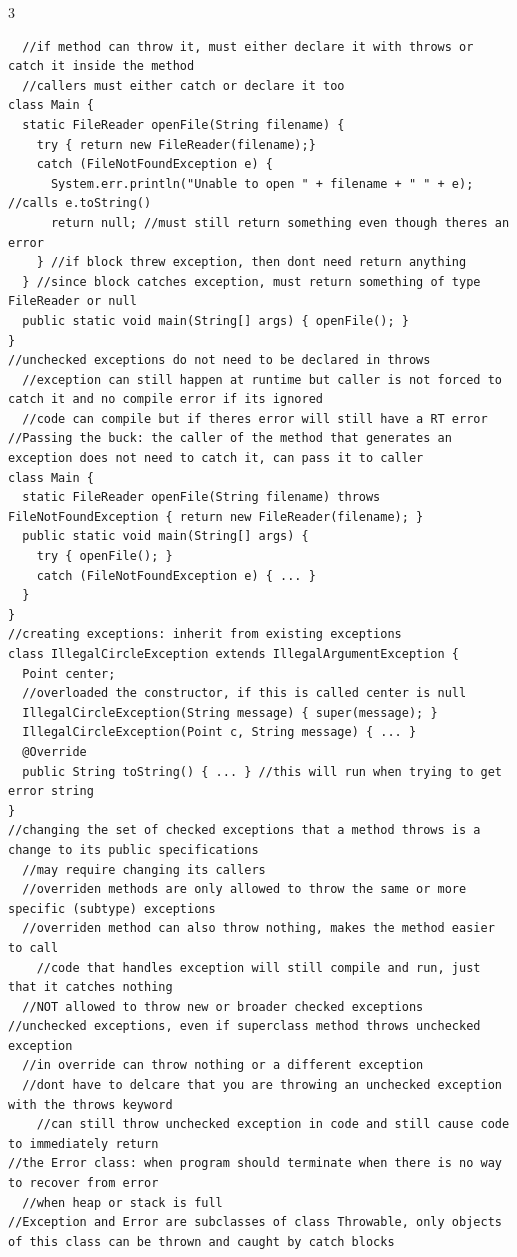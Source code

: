 \documentclass[10pt,a4paper]{article}
\begin{document}
\begin{multicols*}{3}
\begin{verbatim}
  //if method can throw it, must either declare it with throws or catch it inside the method
  //callers must either catch or declare it too
class Main {
  static FileReader openFile(String filename) {
    try { return new FileReader(filename);} 
    catch (FileNotFoundException e) {
      System.err.println("Unable to open " + filename + " " + e); //calls e.toString()
      return null; //must still return something even though theres an error
    } //if block threw exception, then dont need return anything
  } //since block catches exception, must return something of type FileReader or null
  public static void main(String[] args) { openFile(); }
}
//unchecked exceptions do not need to be declared in throws
  //exception can still happen at runtime but caller is not forced to catch it and no compile error if its ignored
  //code can compile but if theres error will still have a RT error
//Passing the buck: the caller of the method that generates an exception does not need to catch it, can pass it to caller
class Main {
  static FileReader openFile(String filename) throws FileNotFoundException { return new FileReader(filename); }
  public static void main(String[] args) {
    try { openFile(); } 
    catch (FileNotFoundException e) { ... }
  }
}
//creating exceptions: inherit from existing exceptions
class IllegalCircleException extends IllegalArgumentException {
  Point center;
  //overloaded the constructor, if this is called center is null
  IllegalCircleException(String message) { super(message); }
  IllegalCircleException(Point c, String message) { ... }
  @Override
  public String toString() { ... } //this will run when trying to get error string
}
//changing the set of checked exceptions that a method throws is a change to its public specifications
  //may require changing its callers
  //overriden methods are only allowed to throw the same or more specific (subtype) exceptions
  //overriden method can also throw nothing, makes the method easier to call
    //code that handles exception will still compile and run, just that it catches nothing
  //NOT allowed to throw new or broader checked exceptions
//unchecked exceptions, even if superclass method throws unchecked exception
  //in override can throw nothing or a different exception
  //dont have to delcare that you are throwing an unchecked exception with the throws keyword
    //can still throw unchecked exception in code and still cause code to immediately return
//the Error class: when program should terminate when there is no way to recover from error
  //when heap or stack is full
//Exception and Error are subclasses of class Throwable, only objects of this class can be thrown and caught by catch blocks

\end{verbatim}
\end{multicols*}
\end{document}
